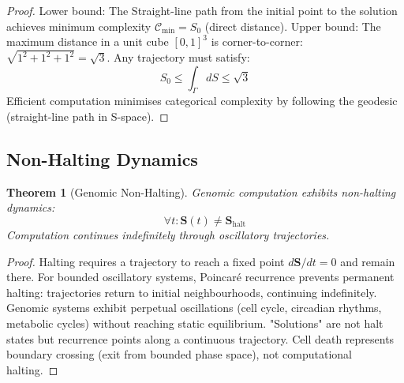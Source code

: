 \documentclass[11pt,a4paper]{article}
\newtheorem{theorem}{Theorem}[section]
\theoremstyle{remark}
\newcommand{\Scoord}{\mathbf{S}}
\begin{document}
\begin{proof}
Lower bound: The Straight-line path from the initial point to the solution achieves minimum complexity $\mathcal{C}_{\text{min}} = S_0$ (direct distance). Upper bound: The maximum distance in a unit cube $[0,1]^3$ is corner-to-corner: $\sqrt{1^2 + 1^2 + 1^2} = \sqrt{3}$. Any trajectory must satisfy:
\begin{equation}
S_0 \leq \int_{\Gamma} dS \leq \sqrt{3}
\end{equation}
Efficient computation minimises categorical complexity by following the geodesic (straight-line path in S-space).
\end{proof}

\subsection{Non-Halting Dynamics}

\begin{theorem}[Genomic Non-Halting]
\label{thm:genomic_non_halting}
Genomic computation exhibits non-halting dynamics:
\begin{equation}
\forall t : \Scoord(t) \neq \Scoord_{\text{halt}}
\end{equation}
Computation continues indefinitely through oscillatory trajectories.
\end{theorem}

\begin{proof}
Halting requires a trajectory to reach a fixed point $d\Scoord/dt = 0$ and remain there. For bounded oscillatory systems, Poincaré recurrence prevents permanent halting: trajectories return to initial neighbourhoods, continuing indefinitely. Genomic systems exhibit perpetual oscillations (cell cycle, circadian rhythms, metabolic cycles) without reaching static equilibrium. "Solutions" are not halt states but recurrence points along a continuous trajectory. Cell death represents boundary crossing (exit from bounded phase space), not computational halting.
\end{proof}
\end{document}

